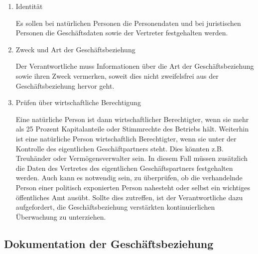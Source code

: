 \documentclass{article}
\begin{document}
        \begin{enumerate}

            \item Identität

                Es sollen bei natürlichen Personen die Personendaten und bei juristischen Personen die Geschäftsdaten sowie der Vertreter festgehalten werden.

            \item Zweck und Art der Geschäftsbeziehung

                Der Verantwortliche muss Informationen über die Art der Geschäftsbeziehung sowie ihren Zweck vermerken, soweit dies nicht zweifelsfrei aus der Geschäftsbeziehung hervor geht.


            \item Prüfen über wirtschaftliche Berechtigung

                Eine natürliche Person ist dann wirtschaftlicher Berechtigter, wenn sie mehr als 25 Prozent Kapitalanteile oder Stimmrechte des Betriebs hält.
                Weiterhin ist eine natürliche Person wirtschaftlich Berechtigter, wenn sie unter der Kontrolle des eigentlichen Geschäftpartners steht. Dies könnten z.B. Treuhänder oder Vermögensverwalter sein. In diesem Fall müssen zusätzlich die Daten des Vertretes des eigentlichen Geschäftspartners festgehalten werden.
                Auch kann es notwendig sein, zu überprüfen, ob die verhandelnde Person einer politisch exponierten Person nahesteht oder selbst ein wichtiges öffentliches Amt ausübt. Sollte dies zutreffen, ist der Verantwortliche dazu aufgefordert, die Geschäftsbeziehung verstärkten kontinuierlichen Überwachung zu unterziehen.

        \end{enumerate}           


        \subsection[Dokumentation der Geschäftsbeziehung]{Dokumentation der Geschäftsbeziehung}
\end{document}
